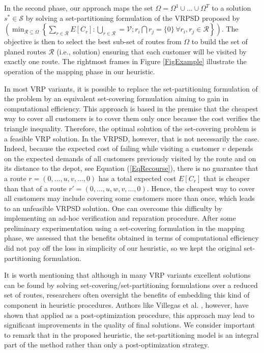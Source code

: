 In the second phase, our approach maps the set $\Omega=\Omega^1\cup \ldots \cup \Omega^T$ to a solution $s^{*}\in\mathcal{S}$ by solving a set-partitioning formulation of the VRPSD proposed by \citet{Christiansen2007} $\left( \min_{\mathcal{R}\subseteq \Omega} \left\{ \sum_{r\in \mathcal{R}}E[C_{r}]: \bigcup_{r \in \mathcal{R}}=\mathcal{V} ;  r_i \bigcap r_j=\{0\} \, \forall r_i,r_j \in  \mathcal{R} \right\}\right)$. The objective is then to select the best sub-set of routes from $\Omega$ to build the set of planed routes $\mathcal{R}$ (i.e., solution) ensuring that each customer will be visited by exactly one route. The rightmost frames in Figure \ref{FigExample} illustrate the operation of the mapping phase in our heuristic.

In most VRP variants, it is possible to replace the set-partitioning formulation of the problem by an equivalent set-covering formulation aiming to gain in computational efficiency. This approach is based in the premise that the cheapest way to cover all customers is to cover them only once because the cost verifies the triangle inequality. Therefore, the optimal solution of the set-covering problem is a feasible VRP solution. In the VRPSD, however, that is not necessarily the case. Indeed, because the expected cost of failing while visiting a customer $v$ depends on the expected demands of all customers previously visited by the route and on its distance to the depot, see Equation (\ref{EqRecourse}), there is no guarantee that a route $r=(0,\ldots,u,v,\ldots,0)$ has a total expected cost $E[C_{r}]$ that is cheaper than that of a route $r'=(0,\ldots,u,w,v,\ldots,0)$. Hence, the cheapest way to cover all customers may include covering some customers more than once, which leads to an unfeasible VRPSD solution. One can overcome this difficulty by implementing an ad-hoc verification and reparation procedure. After some preliminary experimentation using a set-covering formulation in the mapping phase, we assessed that the benefits obtained in terms of computational efficiency did not pay off the loss in simplicity of our heuristic, so we kept the original set-partitioning formulation.

It is worth mentioning that although in many VRP variants excellent solutions can be found by solving set-covering/set-partitioning formulations over a reduced set of routes, researchers often oversight the benefits of embedding this kind of component in heuristic procedures. Authors like Villegas et al. \cite{Villegas2011}, however, have shown that applied as a post-optimization procedure, this approach may lead to significant improvements in the quality of final solutions. We consider important to remark that in the proposed heuristic, the set-partitioning model is an integral part of the method rather than only a post-optimization strategy.


